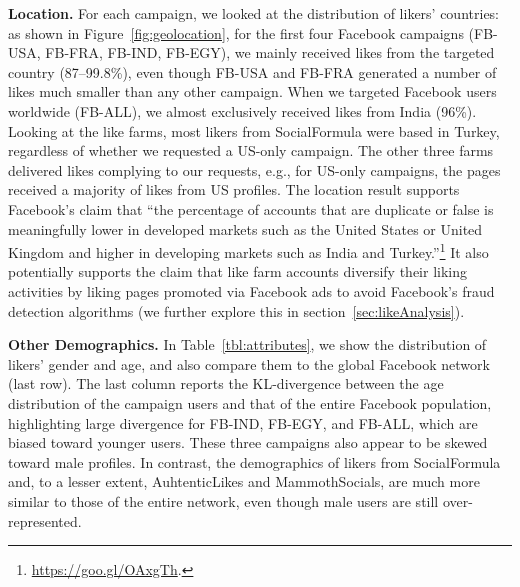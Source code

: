 \documentclass[twocolumn,10pt,letterpaper]{article}
\newcommand{\descr}[1]{\smallskip\noindent\textbf{#1}}
\begin{document}
\descr{Location.} For each campaign, we looked at the distribution of likers' countries: as shown in Figure~\ref{fig:geolocation}, for the first four Facebook campaigns (FB-USA, FB-FRA, FB-IND, FB-EGY), we mainly received likes from the targeted country (87--99.8\%), even though FB-USA and FB-FRA generated a number of likes much smaller than any other campaign.
When we targeted Facebook users worldwide (FB-ALL), we almost exclusively received likes from India (96\%).
%
Looking at the like farms, most likers from SocialFormula were based in Turkey, regardless of whether we requested a US-only campaign. The other three farms delivered likes complying to our requests, e.g., for US-only campaigns, the pages received a majority of likes from US profiles. The location result supports Facebook's claim that ``the percentage of accounts that are duplicate or false is meaningfully lower in developed markets such as the United States or United Kingdom and higher in developing markets such as India and Turkey.''\footnote{\url{https://goo.gl/OAxgTh}.} It also potentially supports the claim that like farm accounts diversify their liking activities by liking pages promoted via Facebook ads to avoid Facebook's fraud detection algorithms (we further explore this in section~\ref{sec:likeAnalysis}).


\descr{Other Demographics.}
%
In Table~\ref{tbl:attributes}, we show the distribution of likers' gender and age, and also compare them to the global Facebook network (last row). The last column reports the KL-divergence between the age distribution of the campaign users and that of the entire Facebook population, highlighting large divergence for FB-IND, FB-EGY, and FB-ALL, which are biased toward
younger users. These three campaigns also appear to be skewed toward male profiles.
%
%
In contrast, the demographics of likers from SocialFormula and, to a lesser extent, AuhtenticLikes and MammothSocials, are much more similar to those of the entire network, even though male users are still over-represented. %
\end{document}
